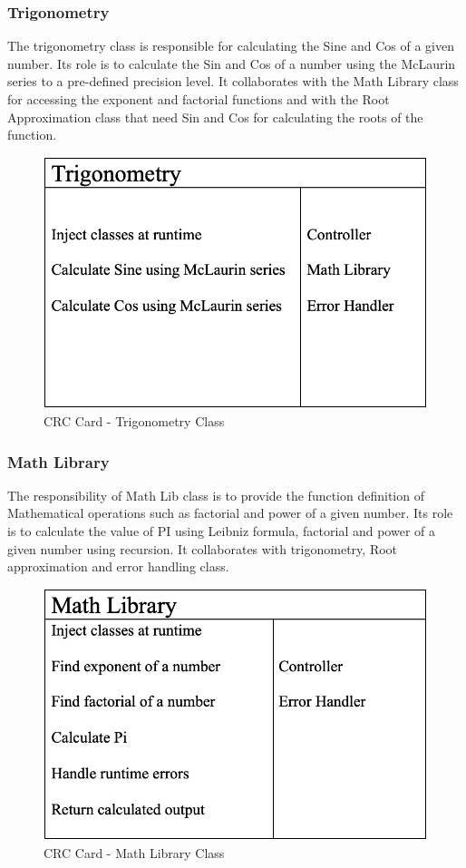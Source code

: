     \subsubsection{Trigonometry}
    \parbox{1.0\linewidth}{
      The trigonometry class is responsible for calculating the Sine and Cos of a given number. Its role is to calculate the Sin and Cos of a number using the McLaurin series to a pre-defined precision level. It collaborates with the Math Library class for accessing the exponent and factorial functions and with the Root Approximation class that need Sin and Cos for calculating the roots of the function.
    }
    \vspace*{2em}
    \begin{figure}[h!]
      \centering
      \includegraphics[width=.5\linewidth]{resources/Trigonometry.png}
      \caption{CRC Card - Trigonometry Class}\label{fig:trignometry}
    \end{figure} 

    \subsubsection{Math Library}
      \parbox{1.0\linewidth}{
        The responsibility of Math Lib class is to provide the function definition of Mathematical operations such as factorial and power of a given number. Its role is to calculate the value of PI using Leibniz formula, factorial and power of a given number using recursion. It collaborates with trigonometry, Root approximation and error handling class.
      }
      \vspace*{2em}
      \begin{figure}[h!]
        \centering
        \includegraphics[width=.5\linewidth]{resources/MathLib.png}
        \caption{CRC Card - Math Library Class}\label{fig:mathlib}
      \end{figure}
      
